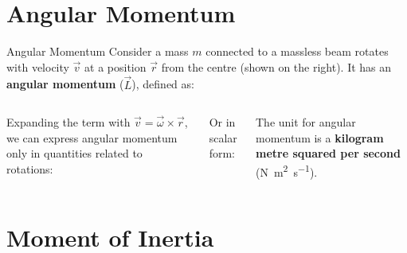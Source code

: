 \documentclass[12pt,compress,aspectratio=169]{beamer}
\begin{document}
\section{Angular Momentum}

\begin{frame}{Angular Momentum}
  Consider a mass $m$ connected to a massless beam rotates with velocity
  $\vec v$ at a position $\vec r$ from the centre (shown on the right). It has
  an \textbf{angular momentum} ($\vec L$), defined as:
  \begin{columns}
    

    \vspace{-.1in}Expanding the term with $\vec v=\vec\omega\times\vec r$, we
    can express angular momentum only in quantities related to rotations:

    
    \vspace{-.2in}Or in scalar form:
    

    \vspace{-.2in}The unit for angular momentum is a
    \textbf{kilogram metre squared per second}
    (\si{\newton\metre\squared\per\second}).
    
  \end{columns}
\end{frame}



\section{Moment of Inertia}
\end{document}
